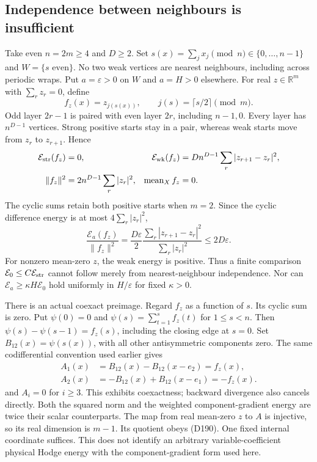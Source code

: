 \subsection{Independence between neighbours is insufficient}
Take even $n=2m\ge4$ and $D\ge2$. Set
$s(x)=\sum_jx_j\pmod n\in\{0,\ldots,n-1\}$ and $W=\{s\text{ even}\}$.
No two weak vertices are nearest neighbours, including across periodic
wraps. Put $a=\varepsilon>0$ on $W$ and $a=H>0$ elsewhere. For real
$z\in\mathbb R^m$ with $\sum_rz_r=0$, define
\[
 f_z(x)=z_{j(s(x))},\qquad
 j(s)=\lceil s/2\rceil\pmod m.
\]
Odd layer $2r-1$ is paired with even layer $2r$, including $n-1,0$.
Every layer has $n^{D-1}$ vertices. Strong positive starts stay in a pair,
whereas weak starts move from $z_r$ to $z_{r+1}$. Hence
\begin{align*}
 \mathcal E_{\rm str}(f_z)&=0,&
 \mathcal E_{\rm wk}(f_z)&=Dn^{D-1}\sum_r|z_{r+1}-z_r|^2,\\
 \|f_z\|^2&=2n^{D-1}\sum_r|z_r|^2,&
 \operatorname{mean}_X f_z&=0.
\end{align*}
The cyclic sums retain both positive starts when $m=2$. Since the cyclic
difference energy is at most $4\sum_r|z_r|^2$,
\[
 \frac{\mathcal E_a(f_z)}{\|f_z\|^2}
 =\frac{D\varepsilon}{2}
   \frac{\sum_r|z_{r+1}-z_r|^2}{\sum_r|z_r|^2}
 \le2D\varepsilon.                                      \tag{D190}
\]
For nonzero mean-zero $z$, the weak energy is positive. Thus a finite
comparison $\mathcal E_0\le C\mathcal E_{\rm str}$ cannot follow merely
from nearest-neighbour independence. Nor can
$\mathcal E_a\ge\kappa H\mathcal E_0$ hold uniformly in
$H/\varepsilon$ for fixed $\kappa>0$.

There is an actual coexact preimage. Regard $f_z$ as a function of $s$.
Its cyclic sum is zero. Put $\psi(0)=0$ and
$\psi(s)=\sum_{t=1}^sf_z(t)$ for $1\le s<n$. Then
$\psi(s)-\psi(s-1)=f_z(s)$, including the closing edge at $s=0$.
Set $B_{12}(x)=\psi(s(x))$, with all other antisymmetric components zero.
The same codifferential convention used earlier gives
\begin{align*}
 A_1(x)&=B_{12}(x)-B_{12}(x-e_2)=f_z(x),\\
 A_2(x)&=-B_{12}(x)+B_{12}(x-e_1)=-f_z(x).
\end{align*}
and $A_i=0$ for $i\ge3$. This exhibits coexactness; backward divergence
also cancels directly. Both the squared norm and the weighted
component-gradient energy are twice their scalar counterparts. The map
from real mean-zero $z$ to $A$ is injective, so its real dimension is
$m-1$. Its quotient obeys (D190). One fixed internal coordinate suffices.
This does not identify an arbitrary variable-coefficient physical Hodge
energy with the component-gradient form used here.

